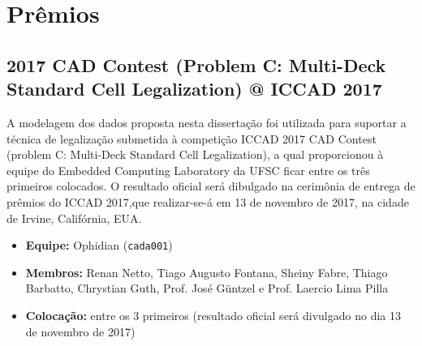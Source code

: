 \section{Prêmios}
\subsection{2017 CAD Contest (Problem C: Multi-Deck Standard Cell Legalization) @ ICCAD 2017}

A modelagem dos dados proposta nesta dissertação foi utilizada para suportar a técnica de legalização submetida à competição ICCAD 2017 CAD Contest (problem C: Multi-Deck Standard Cell Legalization), a qual proporcionou à equipe do Embedded Computing Laboratory da UFSC ficar entre os três primeiros colocados.
O resultado oficial será dibulgado na cerimônia de entrega de prêmios do ICCAD 2017,que realizar-se-á em 13 de novembro de 2017, na cidade de Irvine, Califórnia, EUA.

\begin{itemize}
\item \textbf{Equipe:} Ophidian (\texttt{cada001})
\item \textbf{Membros:} Renan Netto, Tiago Augusto Fontana, Sheiny Fabre, Thiago Barbatto, Chrystian Guth, Prof. José Güntzel e Prof. Laercio Lima Pilla
\item \textbf{Colocação:} entre os 3 primeiros (resultado oficial será divulgado no dia 13 de novembro de 2017)
\end{itemize}

